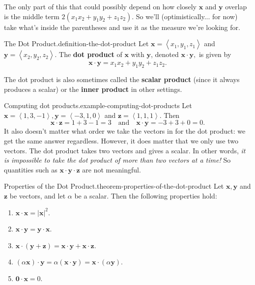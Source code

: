 \documentclass[10pt,]{book}
\newcommand{\terminology}[1]{\textbf{#1}}
\numberwithin{equation}{section}
\newcommand{\vv}[1]{\mathbf{#1}}
\newcommand{\dotprod}[1]{\left\langle #1 \right\rangle}
\begin{document}
\hypertarget{p-1128}{}%
The only part of this that could possibly depend on how closely \(\vv{x}\) and \(\vv{y}\) overlap is the middle term \(2(x_{1}x_{2}+y_{1}y_{2}+z_{1}z_{2})\). So we'll (optimistically... for now) take what's inside the parentheses and use it as the measure we're looking for.%
\begin{definition}{The Dot Product.}{definition-the-dot-product}%
\hypertarget{p-1129}{}%
Let \(\vv{x} = \dotprod{x_{1},y_{1},z_{1}}\) and \(\vv{y} = \dotprod{x_{2},y_{2},z_{2}}\). The \terminology{dot product} of \(\vv{x}\) with \(\vv{y}\), denoted \(\vv{x}\cdot\vv{y},\) is given by%
%
\begin{equation*}
\vv{x}\cdot\vv{y} = x_{1}x_{2}+y_{1}y_{2}+z_{1}z_{2}.
\end{equation*}
\end{definition}
\hypertarget{p-1130}{}%
The dot product is also sometimes called the \terminology{scalar product} (since it always produces a scalar) or the \terminology{inner product} in other settings.%
\begin{example}{Computing dot products.}{example-computing-dot-products}%
\hypertarget{p-1131}{}%
Let \(\vv{x} = \dotprod{1,3,-1},\vv{y} = \dotprod{-3,1,0}\) and \(\vv{z} = \dotprod{1,1,1}\). Then%
%
\begin{equation*}
\vv{x}\cdot\vv{z} = 1+3-1 = 3\quad\text{and}\quad\vv{x}\cdot\vv{y} = -3+3+0 = 0.
\end{equation*}
\hypertarget{p-1132}{}%
It also doesn't matter what order we take the vectors in for the dot product: we get the same answer regardless. However, it does matter that we only use two vectors. The dot product takes two vectors and gives a scalar. In other words, \emph{it is impossible to take the dot product of more than two vectors at a time!} So quantities such as \(\vv{x}\cdot\vv{y}\cdot\vv{z}\) are not meaningful.%
\end{example}
\begin{theorem}{Properties of the Dot Product.}{}{theorem-properties-of-the-dot-product}%
\hypertarget{p-1133}{}%
Let \(\vv{x},\vv{y}\) and \(\vv{z}\) be vectors, and let \(\alpha\) be a scalar. Then the following properties hold:%
\leavevmode%
\begin{multicols}{2}
\begin{enumerate}
\item\hypertarget{li-118}{}\hypertarget{p-1134}{}%
\(\vv{x}\cdot\vv{x} = |\vv{x}|^{2}.\)%
\item\hypertarget{li-119}{}\hypertarget{p-1135}{}%
\(\vv{x}\cdot\vv{y} = \vv{y}\cdot\vv{x}.\)%
\item\hypertarget{li-120}{}\hypertarget{p-1136}{}%
\(\vv{x}\cdot(\vv{y}+\vv{z}) = \vv{x}\cdot\vv{y}+\vv{x}\cdot\vv{z}.\)%
\item\hypertarget{li-121}{}\hypertarget{p-1137}{}%
\((\alpha\vv{x})\cdot\vv{y} = \alpha(\vv{x}\cdot\vv{y}) = \vv{x}\cdot(\alpha\vv{y}).\)%
\item\hypertarget{li-122}{}\hypertarget{p-1138}{}%
\(\vv{0}\cdot\vv{x} = 0.\)%
\end{enumerate}
\end{multicols}
\end{theorem}
\end{document}

